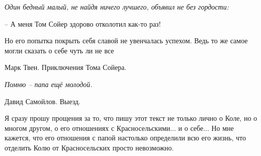 


\vzmscaption

\begin{flushright}
{\it Один бедный малый, не найдя ничего лучшего, объявил не без гордости:

 – А меня Том Сойер здорово отколотил как-то раз!

 Но его попытка покрыть себя  славой  не  увенчалась успехом. Ведь то же
 самое могли сказать о себе чуть ли не все }

Марк Твен. Приключения Тома Сойера.


{\it Помню – папа ещё молодой.}

Давид Самойлов. Выезд.
\end{flushright}

Я сразу прошу прощения  за то, что пишу этот текст не только лично о Коле, но о многом другом, о его отношениях с Красносельскими... и о себе... Но мне кажется, что его отношения с папой настолько определили всю его жизнь, что отделить Колю от Красносельских просто невозможно.

